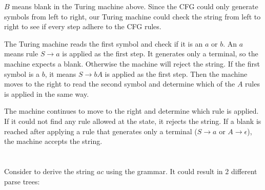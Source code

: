 \documentclass{article}
\begin{document}
$B$ means blank in the Turing machine above. Since the CFG
could only generate symbols from left to right, our Turing machine could
check the string from left to right to see if every step adhere to the CFG
rules.

The Turing machine reads the first symbol and check if it is an
$a$ or $b$. An $a$
means rule $S \rightarrow a$ is applied as the first step. It generates
only a terminal, so the machine expects a blank. Otherwise the machine will
reject the string. If the first symbol is a $b$, it means
$S \rightarrow bA$ is applied as the first step. Then the machine moves to
the right to read the second symbol and determine which of the
$A$ rules is applied in the same way.

The machine continues to move to the right and determine which rule is applied.
If it could not find any rule allowed at the state, it rejects the string. If a
blank is reached after applying a rule that generates only a terminal
($S \rightarrow a$ or $A \rightarrow \epsilon$), the machine accepts the
string.

\section{}
\subsection{}
Consider to derive the string $ac$ using the grammar. It
could result in 2 different parse trees:

\begin{figure}[H]
	\begin{subfigure}{.5\textwidth}
		\centering
	\end{subfigure}%
	\begin{subfigure}{.5\textwidth}
		\centering
	\end{subfigure}
\end{figure}
\end{document}
